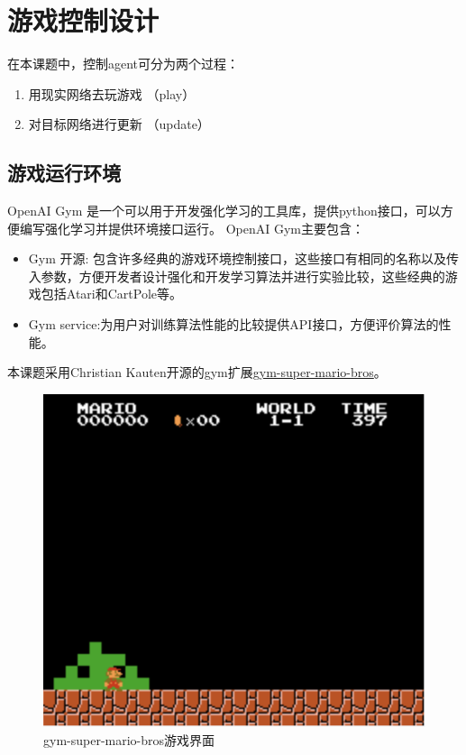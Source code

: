 \chapter{游戏控制设计}
在本课题中，控制agent可分为两个过程：
\begin{enumerate}
  \item 用现实网络去玩游戏 （play）
  \item 对目标网络进行更新 （update）
\end{enumerate}
\section{游戏运行环境}
OpenAI Gym 是一个可以用于开发强化学习的工具库，提供python接口，可以方便编写强化学习并提供环境接口运行。
OpenAI Gym主要包含：
\begin{itemize}
  \item Gym 开源: 包含许多经典的游戏环境控制接口，这些接口有相同的名称以及传入参数，方便开发者设计强化和开发学习算法并进行实验比较，这些经典的游戏包括Atari和CartPole等。
  \item Gym service:为用户对训练算法性能的比较提供API接口，方便评价算法的性能。
\end{itemize}
本课题采用Christian Kauten开源的gym扩展\href{https://github.com/Kautenja/gym-super-mario-bros}{gym-super-mario-bros}\cite{gym-super-mario-bros}。
\begin{figure}
  \centering
  \includegraphics[scale=0.5]{static/mario.png}
  \caption{gym-super-mario-bros游戏界面}
\end{figure}
